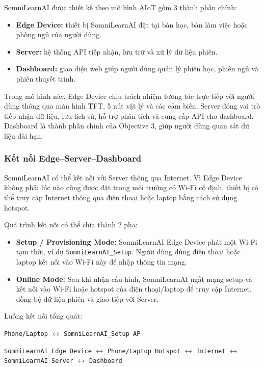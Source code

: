 \documentclass[12pt,a4paper]{article}
\begin{document}
SomniLearnAI được thiết kế theo mô hình AIoT gồm 3 thành phần chính:

\begin{itemize}
    \item \textbf{Edge Device:} thiết bị SomniLearnAI đặt tại bàn học, bàn làm việc hoặc phòng ngủ của người dùng.
    \item \textbf{Server:} hệ thống API tiếp nhận, lưu trữ và xử lý dữ liệu phiên.
    \item \textbf{Dashboard:} giao diện web giúp người dùng quản lý phiên học, phiên ngủ và phiên thuyết trình.
\end{itemize}

Trong mô hình này, Edge Device chịu trách nhiệm tương tác trực tiếp với người dùng thông qua màn hình TFT, 5 nút vật lý và các cảm biến. Server đóng vai trò tiếp nhận dữ liệu, lưu lịch sử, hỗ trợ phân tích và cung cấp API cho dashboard. Dashboard là thành phần chính của Objective 3, giúp người dùng quan sát dữ liệu dài hạn.

\subsubsection{Kết nối Edge--Server--Dashboard}

SomniLearnAI có thể kết nối với Server thông qua Internet. Vì Edge Device không phải lúc nào cũng được đặt trong môi trường có Wi-Fi cố định, thiết bị có thể truy cập Internet thông qua điện thoại hoặc laptop bằng cách sử dụng hotspot.

Quá trình kết nối có thể chia thành 2 pha:

\begin{itemize}
    \item \textbf{Setup / Provisioning Mode:} SomniLearnAI Edge Device phát một Wi-Fi tạm thời, ví dụ \texttt{SomniLearnAI\_Setup}. Người dùng dùng điện thoại hoặc laptop kết nối vào Wi-Fi này để nhập thông tin mạng.
    \item \textbf{Online Mode:} Sau khi nhận cấu hình, SomniLearnAI ngắt mạng setup và kết nối vào Wi-Fi hoặc hotspot của điện thoại/laptop để truy cập Internet, đồng bộ dữ liệu phiên và giao tiếp với Server.
\end{itemize}

Luồng kết nối tổng quát:

\begin{center}
\texttt{Phone/Laptop} $\leftrightarrow$ \texttt{SomniLearnAI\_Setup AP}

\texttt{SomniLearnAI Edge Device} $\leftrightarrow$ \texttt{Phone/Laptop Hotspot} $\leftrightarrow$ \texttt{Internet} $\leftrightarrow$ \texttt{SomniLearnAI Server} $\leftrightarrow$ \texttt{Dashboard}
\end{center}
\end{document}
